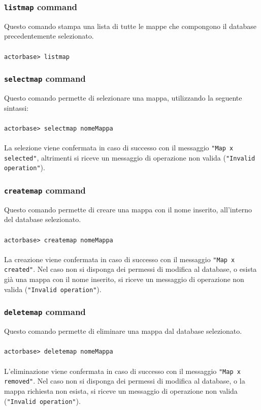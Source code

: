 \documentclass[a4paper]{article}
\begin{document}
	\subsubsection{\texttt{listmap} command}
	Questo comando stampa una lista di tutte le mappe che compongono il database precedentemente selezionato.
	\\ \\
	\texttt{actorbase>	listmap}

	\subsubsection{\texttt{selectmap} command}
	Questo comando permette di selezionare una mappa, utilizzando la seguente sintassi:
	\\ \\
	\texttt{actorbase>	selectmap nomeMappa}
	\\ \\
	La selezione viene confermata in caso di successo con il messaggio \texttt{"Map x selected"}, altrimenti si riceve un messaggio di operazione non valida (\texttt{"Invalid operation"}).

	\subsubsection{\texttt{createmap} command}
	Questo comando permette di creare una mappa con il nome inserito, all'interno del database selezionato.
	\\ \\
	\texttt{actorbase>	createmap nomeMappa}
	\\ \\
	La creazione viene confermata in caso di successo con il messaggio \texttt{"Map x created"}. Nel caso non si disponga dei permessi di modifica al database, o esista già una mappa con il nome inserito, si riceve un messaggio di operazione non valida (\texttt{"Invalid operation"}).

	\subsubsection{\texttt{deletemap} command}
	Questo comando permette di eliminare una mappa dal database selezionato. 
	\\ \\
	\texttt{actorbase>	deletemap nomeMappa}
	\\ \\
	L'eliminazione viene confermata in caso di successo con il messaggio \texttt{"Map x removed"}. Nel caso non si disponga dei permessi di modifica al database, o la mappa richiesta non esista, si riceve un messaggio di operazione non valida (\texttt{"Invalid operation"}).
	
\end{document}
